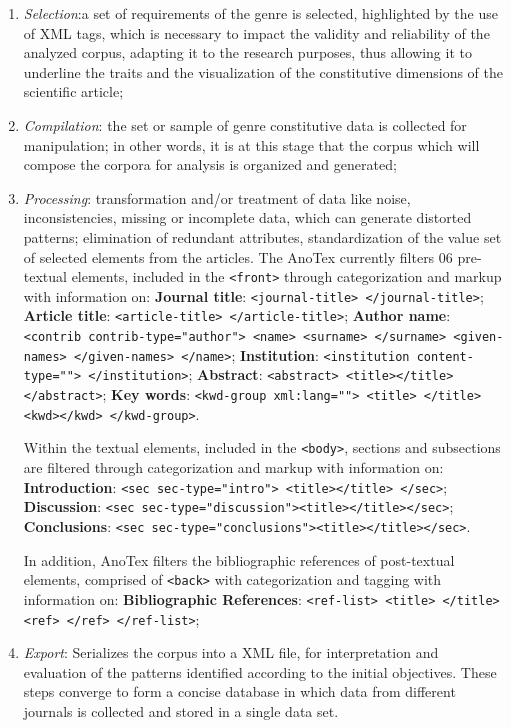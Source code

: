 \documentclass[english]{textolivre}
\begin{document}
\begin{enumerate}
    \item \textit{Selection}:a set of requirements of the genre is selected, highlighted by the use of XML tags, which is necessary to impact the validity and reliability of the analyzed corpus, adapting it to the research purposes, thus allowing it to underline the traits and the visualization of the constitutive dimensions of the scientific article;
    \item \textit{Compilation}: the set or sample of genre constitutive data is collected for manipulation; in other words, it is at this stage that the corpus which will compose the corpora for analysis is organized and generated;
    \item \textit{Processing}: transformation and/or treatment of data like noise, inconsistencies, missing or incomplete data, which can generate distorted patterns; elimination of redundant attributes, standardization of the value set of selected elements from the articles.
The AnoTex currently filters 06 pre-textual elements, included in the \texttt{<front>} through categorization and markup with information on: \textbf{Journal title}: \texttt{<journal-title> </journal-title>}; \textbf{Article title}: \texttt{<article-title> </article-title>}; \textbf{Author name}: \texttt{<contrib contrib-type="author"> <name> <surname> </surname> <given-names> </given-names> </name>}; \textbf{Institution}: \texttt{<institution content-type=""> </institution>}; \textbf{Abstract}: \texttt{<abstract> <title></title> </abstract>}; \textbf{Key words}: \texttt{<kwd-group xml:lang=""> <title> </title> <kwd></kwd> </kwd-group>}.
  
Within the textual elements, included in the \texttt{<body>}, sections and subsections are filtered through categorization and markup with information on: \textbf{Introduction}: \texttt{<sec sec-type="intro"> <title></title> </sec>}; \textbf{Discussion}: \texttt{<sec sec-type="discussion"><title></title></sec>}; \textbf{Conclusions}: \texttt{<sec sec-type="conclusions"><title></title></sec>}.

In addition, AnoTex filters the bibliographic references of post-textual elements, comprised of \texttt{<back>} with categorization and tagging with information on: \textbf{Bibliographic References}: \texttt{<ref-list> <title> </title> <ref> </ref> </ref-list>};
    \item \textit{Export}: Serializes the corpus into a XML file, for interpretation and evaluation of the patterns identified according to the initial objectives. These steps converge to form a concise database in which data from different journals is collected and stored in a single data set.
\end{enumerate}
\end{document}
